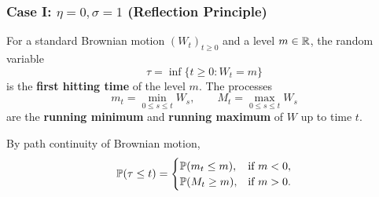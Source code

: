 \subsubsection*{Case I: $\eta = 0, \sigma = 1$ (Reflection Principle)}

\begin{definition}\label{def:hitting-time}
    For a standard Brownian motion $(W_t)_{t \ge 0}$ and a level $m \in \mathbb{R}$, the random variable
    \[
    \tau = \inf\{t \ge 0 : W_t = m\}
    \]
    is the \textbf{first hitting time} of the level $m$. The processes
    \[
    m_t = \min_{0 \le s \le t} W_s, \qquad M_t = \max_{0 \le s \le t} W_s
    \]
    are the \textbf{running minimum} and \textbf{running maximum} of $W$ up to time $t$.
\end{definition}

\begin{proposition}\label{prop:hitting-extrema}
    By path continuity of Brownian motion,
    \[
    \mathbb{P}(\tau \le t) = \begin{cases}
        \mathbb{P}(m_t \le m), & \text{if } m < 0, \\
        \mathbb{P}(M_t \ge m), & \text{if } m > 0.
    \end{cases}
    \]
\end{proposition}

